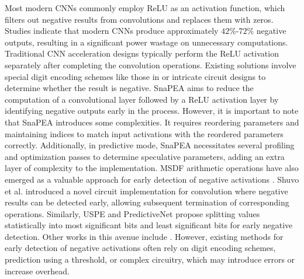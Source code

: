 \documentclass[conference]{IEEEtran}
\begin{document}
Most modern CNNs commonly employ ReLU as an activation function, which filters out negative results from convolutions and replaces them with zeros. Studies \cite{akhlaghi2018snapea, lee2018compend, kim2021compreend} indicate that modern CNNs produce approximately $42\%$-$72\%$ negative outputs, resulting in a significant power wastage on unnecessary computations. Traditional CNN acceleration designs typically perform the ReLU activation separately after completing the convolution operations. Existing solutions involve special digit encoding schemes like those in \cite{lee2018compend, kim2021compreend} or intricate circuit designs \cite{akhlaghi2018snapea, shuvo2020msb} to determine whether the result is negative. SnaPEA \cite{akhlaghi2018snapea} aims to reduce the computation of a convolutional layer followed by a ReLU activation layer by identifying negative outputs early in the process. However, it is important to note that SnaPEA introduces some complexities. It requires reordering parameters and maintaining indices to match input activations with the reordered parameters correctly. Additionally, in predictive mode, SnaPEA necessitates several profiling and optimization passes to determine speculative parameters, adding an extra layer of complexity to the implementation. MSDF arithmetic operations have also emerged as a valuable approach for early detection of negative activations \cite{shuvo2020msb, karadeniz2021talipot}. Shuvo et al. \cite{shuvo2020msb} introduced a novel circuit implementation for convolution where negative results can be detected early, allowing subsequent termination of corresponding operations. Similarly, USPE \cite{song2018prediction} and PredictiveNet \cite{lin2017predictivenet} propose splitting values statistically into most significant bits and least significant bits for early negative detection. Other works in this avenue include \cite{asadikouhanjani2020novel, suresh2021early, pan2023bitset}. However, existing methods for early detection of negative activations often rely on digit encoding schemes, prediction using a threshold, or complex circuitry, which may introduce errors or increase overhead. 
\end{document}
